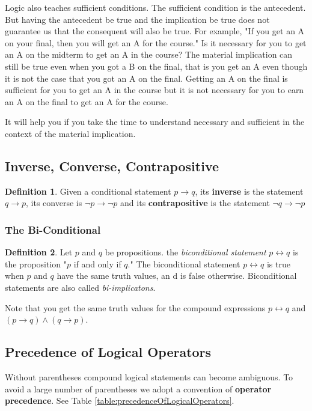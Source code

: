 \documentclass[11pt]{book} %
\theoremstyle {definition}
\newtheorem {definition}{Definition}[section]
\theoremstyle {remark}
\begin{document}
Logic also teaches sufficient conditions. The sufficient condition is the antecedent. But having the antecedent be true and the implication be true does not guarantee us that the consequent will also be true. For example, "If you get an A on your final, then you will get an A for the course." Is it necessary for you to get an A on the midterm to get an A in the course? The material implication can still be true even when you got a B on the final, that is you get an A even though it is not the case that you got an A on the final. Getting an A on the final is sufficient for you to get an A in the course but it is not necessary for you to earn an A on the final to get an A for the course.

It will help you if you take the time to understand necessary and sufficient in the context of the material implication.



    \subsection {Inverse, Converse, Contrapositive}
\begin {definition}
Given a conditional statement $p \rightarrow q$, its \textbf{inverse} is the statement $q \rightarrow p$, its converse is $\lnot p \rightarrow \lnot p$ and its \textbf{contrapositive} is the statement $\lnot q \rightarrow \lnot p $
\end {definition}
 

        \subsubsection {The Bi-Conditional}
\begin {definition}
Let $p$ and $q$ be propositions. the \textit{biconditional statement} $p \leftrightarrow q$ is the proposition "$p$ if and only if $q$." The biconditional statement $p \leftrightarrow q$ is true when $p$ and $q$ have the same truth values, an d is false otherwise. Biconditional statements are also called \textit{bi-implicatons}.
 \end {definition}
 Note that you get the same truth values for the compound expressions $p \leftrightarrow q$ and $(p \rightarrow q) \land (q \rightarrow p)$.
 
     \subsection{Precedence of Logical Operators}
Without parentheses compound logical statements can become ambiguous. To avoid a large number of parentheses we adopt a convention of \textbf{operator precedence}. See Table \ref{table:precedenceOfLogicalOperators}.
\end{document}
